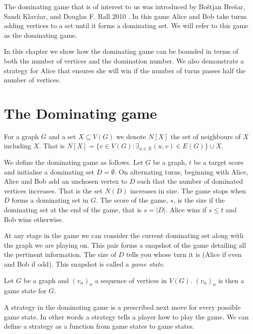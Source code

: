 The dominating game that is of interest to us was introduced by Bo\v{s}tjan Bre\v{s}ar, Sandi Klav\v{z}ar, and Douglas F. Rall 2010 \cite{BrKlRa2010}. In this game Alice and Bob take turns adding vertices to a set until it forms a dominating set. We will refer to this game as the dominating game.

In this chapter we show how the dominating game can be bounded in terms of both the number of vertices and the domination number. We also demonstrate a strategy for Alice that ensures she will win if the number of turns passes half the number of vertices.


\section{The Dominating game}

For a graph $G$ and a set $X\subseteq V(G)$ we denote $N[X]$ the set of neighbours of $X$ including $X$. That is $N[X] = \{v\in V(G) : \exists_{u\in X} (u,v)\in E(G)\}\cup X$. 

We define the dominating game as follows. Let $G$ be a graph, $t$ be a target score and initialise a dominating set $D=\emptyset$. On alternating turns, beginning with Alice, Alice and Bob add an unchosen vertex to $D$ such that the number of dominated vertices increases. That is the set $N(D)$ increases in size. The game stops when $D$ forms a dominating set in $G$. The score of the game, $s$, is the size if the dominating set at the end of the game, that is $s=|D|$. Alice wins if $s\leq t$ and Bob wins otherwise.

At any stage in the game we can consider the current dominating set along with the graph we are playing on. This pair forms a snapshot of the game detailing all the pertinent information. The size of $D$ tells you whose turn it is (Alice if even and Bob if odd). This snapshot is called a \textit{game state}. 

\begin{definition}
    Let $G$ be a graph and $(v_n)_n$ a sequence of vertices in $V(G)$. $(v_n)_n$ is then a game state for $G$.
\end{definition}

A strategy in the dominating game is a prescribed next move for every possible game state. In other words a strategy tells a player how to play the game. We can define a strategy as a function from game states to game states. 

